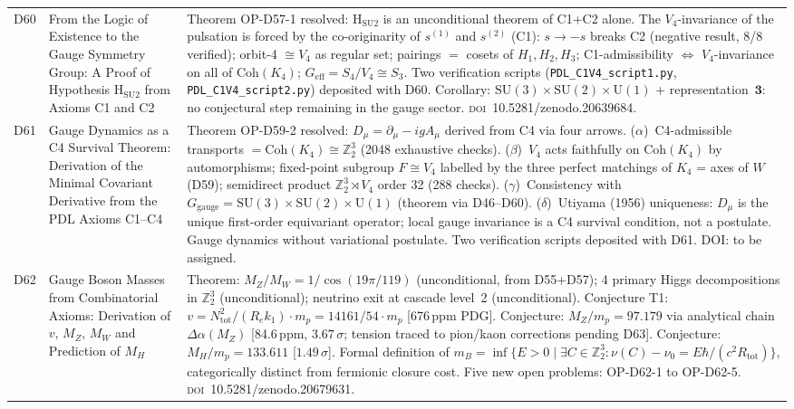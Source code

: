 \documentclass[11pt,a4paper]{article}
\theoremstyle{plain}
\theoremstyle{definition}
\theoremstyle{remark}
\begin{document}
\begin{longtable}{L{1.3cm}L{3.8cm}L{8.0cm}}
D60 & From the Logic of Existence to the Gauge Symmetry Group: A Proof of Hypothesis H$_{\mathrm{SU2}}$ from Axioms C1 and C2~\cite{D60} & \textcolor{proofblue}{Theorem} OP-D57-1 resolved: H$_{\mathrm{SU2}}$ is an unconditional theorem of C1+C2 alone. The $V_4$-invariance of the pulsation is forced by the co-originarity of $s^{(1)}$ and $s^{(2)}$ (C1): $s \to -s$ breaks C2 (negative result, 8/8 verified); orbit-4 $\cong V_4$ as regular set; pairings $= $ cosets of $H_1,H_2,H_3$; C1-admissibility $\Leftrightarrow$ $V_4$-invariance on all of $\mathrm{Coh}(K_4)$; $G_{\mathrm{eff}} = S_4/V_4 \cong S_3$. Two verification scripts (\texttt{PDL\_C1V4\_script1.py}, \texttt{PDL\_C1V4\_script2.py}) deposited with D60. Corollary: $\mathrm{SU}(3)\times\mathrm{SU}(2)\times\mathrm{U}(1)$ + representation~$\mathbf{3}$: no conjectural step remaining in the gauge sector. \textsc{doi}~10.5281/zenodo.20639684.\\[0.4em]
D61 & Gauge Dynamics as a C4 Survival Theorem: Derivation of the Minimal Covariant Derivative from the PDL Axioms C1--C4~\cite{D61} & \textcolor{proofblue}{Theorem} OP-D59-2 resolved: $D_\mu = \partial_\mu - igA_\mu$ derived from C4 via four arrows. ($\alpha$)~C4-admissible transports $= \mathrm{Coh}(K_4) \cong \mathbb{Z}_2^3$ (2048 exhaustive checks). ($\beta$)~$V_4$ acts faithfully on $\mathrm{Coh}(K_4)$ by automorphisms; fixed-point subgroup $F \cong V_4$ labelled by the three perfect matchings of $K_4$ = axes of $W$ (D59); semidirect product $\mathbb{Z}_2^3\rtimes V_4$ order 32 (288 checks). ($\gamma$)~Consistency with $G_{\mathrm{gauge}} = \mathrm{SU}(3)\times\mathrm{SU}(2)\times\mathrm{U}(1)$ (theorem via D46--D60). ($\delta$)~Utiyama (1956) uniqueness: $D_\mu$ is the unique first-order equivariant operator; local gauge invariance is a C4 survival condition, not a postulate. Gauge dynamics without variational postulate. Two verification scripts deposited with D61. DOI: to be assigned.\\[0.4em]
D62 & Gauge Boson Masses from Combinatorial Axioms: Derivation of $v$, $M_Z$, $M_W$ and Prediction of $M_H$~\cite{D62} & \textcolor{proofblue}{Theorem}: $M_Z/M_W = 1/\cos(19\pi/119)$ (unconditional, from D55+D57); 4 primary Higgs decompositions in $\mathbb{Z}_2^3$ (unconditional); neutrino exit at cascade level~2 (unconditional). \textcolor{conjecturegreen}{Conjecture T1}: $v = N_{\mathrm{tot}}^2/(R_e k_1)\cdot m_p = 14161/54\cdot m_p$ [676\,ppm PDG]. \textcolor{conjecturegreen}{Conjecture}: $M_Z/m_p = 97.179$ via analytical chain $\Delta\alpha(M_Z)$ [84.6\,ppm, $3.67\,\sigma$; tension traced to pion/kaon corrections pending D63]. \textcolor{conjecturegreen}{Conjecture}: $M_H/m_p = 133.611$ [$1.49\,\sigma$]. Formal definition of $m_B = \inf\{E>0 \mid \exists C\in\mathbb{Z}_2^3: \nu(C)-\nu_0 = E\hbar/(c^2 R_{\mathrm{tot}})\}$, categorically distinct from fermionic closure cost. Five new open problems: OP-D62-1 to OP-D62-5. \textsc{doi}~10.5281/zenodo.20679631.\\[0.4em]

\end{longtable}
\end{document}
